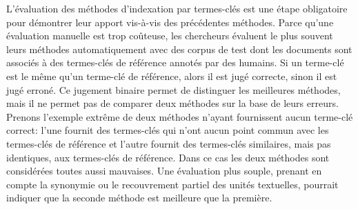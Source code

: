     L'évaluation des méthodes d'indexation par termes-clés est une étape
    obligatoire pour démontrer leur apport vis-à-vis des précédentes méthodes.
    Parce qu'une évaluation manuelle est trop coûteuse, les chercheurs évaluent
    le plus souvent leurs méthodes automatiquement avec des corpus de test dont
    les documents sont associés à des termes-clés de référence annotés par des
    humains. Si un terme-clé est le même qu'un terme-clé de référence, alors
    il est jugé correcte, sinon il est jugé erroné. Ce jugement binaire permet
    de distinguer les meilleures méthodes, mais il ne permet pas de comparer
    deux méthodes sur la base de leurs erreurs. Prenons l'exemple extrême de
    deux méthodes n'ayant fournissent aucun terme-clé correct: l'une fournit
    des termes-clés qui n'ont aucun point commun avec les termes-clés de
    référence et l'autre fournit des termes-clés similaires, mais pas
    identiques, aux termes-clés de référence. Dans ce cas les deux méthodes sont
    considérées toutes aussi mauvaises. Une évaluation plus souple, prenant en
    compte la synonymie ou le recouvrement partiel des unités textuelles,
    pourrait indiquer que la seconde méthode est meilleure que la première.

